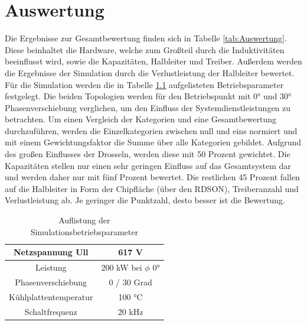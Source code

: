 \chapter{Auswertung}
Die Ergebnisse zur Gesamtbewertung finden sich in Tabelle \ref{tab:Auswertung}. Diese beinhaltet die Hardware, welche zum Großteil durch die Induktivitäten beeinflusst wird, sowie die Kapazitäten, Halbleiter und Treiber. Außerdem werden die Ergebnisse der Simulation durch die Verlustleistung der Halbleiter bewertet. Für die Simulation werden die in Tabelle \ref{tab:Betriebspara} aufgelisteten Betriebsparameter festgelegt. Die beiden Topologien werden für den Betriebspunkt mit 0° und 30° Phasenverschiebung verglichen, um den Einfluss der Systemdienstleistungen zu betrachten. Um einen Vergleich der Kategorien und eine Gesamtbewertung durchzuführen, werden die Einzelkategorien zwischen null und eins normiert und mit einem Gewichtungsfaktor die Summe über alle Kategorien gebildet. Aufgrund des großen Einflusses der Drosseln, werden diese mit 50 Prozent gewichtet. Die Kapazitäten stellen nur einen sehr geringen Einfluss auf das Gesamtsystem dar und werden daher nur mit fünf Prozent bewertet. Die restlichen 45 Prozent fallen auf die Halbleiter in Form der Chipfläche (über den \gls{RDSON}), Treiberanzahl und Verlustleistung ab. Je geringer die Punktzahl, desto besser ist die Bewertung. \\

	
\begin{table}
	\centering
\begin{tabular}{|c|c|}
	\hline
	Netzspannung \gls{Ull} & 617 \si{\volt} \\
	\hline
	Leistung & 200 kW bei $\phi$ 0° \\
	\hline
	Phasenverschiebung & 0 / 30 Grad \\
	\hline
	Kühlplattentemperatur & 100 °C \\
	\hline
	Schaltfrequenz & 20 kHz \\
	\hline
\end{tabular}
\caption{Auflistung der Simulationsbetriebsparameter}
\label{tab:Betriebspara}
\end{table}


